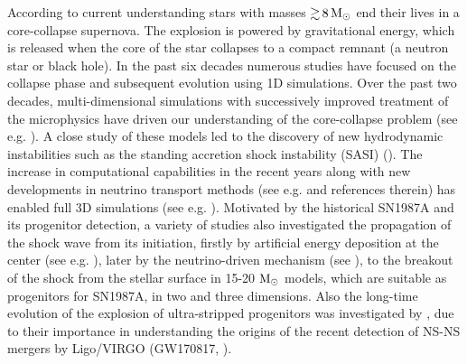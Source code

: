 \documentclass[fleqn,usenatbib]{mnras}
\newcommand{\solm}{\ensuremath{\rm{M_{\odot}}}\xspace}
\begin{document}
According to current understanding stars with masses 
$\mathord{\gtrsim}\,8\, \solm$ end their lives in a core-collapse 
supernova. The explosion is powered by gravitational energy, 
which is released when the core of the star collapses to a compact 
remnant (a neutron star or black hole). In the past six decades 
numerous studies have focused on the collapse phase and subsequent 
evolution using 1D simulations. Over the past two decades, 
multi-dimensional simulations with successively improved treatment 
of the microphysics have driven our understanding of the core-collapse 
problem (see e.g. \citealt{Janka2012,Burrows2013,Janka2016}). 
A close study of these models led to the discovery of new hydrodynamic 
instabilities such as the standing accretion shock instability (SASI) 
(\citealt{Blondin2003,Foglizzo2007}). The increase in computational 
capabilities in the recent years along with new developments in 
neutrino transport methods (see e.g. 
\citealt{Buras2006,OConnor2018,Skinner2019,Glas2019} and references therein)
has enabled full 3D simulations (see e.g. 
\citealt{Melson2015a,Summa2016,Mueller2017,Mueller2018,Vartanyan2018,Melson2019,Vartanyan2019}). 
Motivated by the historical SN1987A and its progenitor detection, a 
variety of studies also investigated the propagation of the shock 
wave from its initiation, firstly by artificial energy deposition 
at the center (see e.g. \citealt{Mueller1991}), later by the 
neutrino-driven mechanism (see \citealt{Kifonidis2003,Hammer2010,Wongwathanarat2015}), 
to the breakout of the shock from the stellar surface in 15-20 $\solm$ models, 
which are suitable as progenitors for SN1987A, in two and three dimensions. 
Also the long-time evolution of the explosion of ultra-stripped 
progenitors was investigated by \cite{Mueller2018}, due to their 
importance in understanding the origins of the recent detection of 
NS-NS mergers by Ligo/VIRGO (GW170817, \citealt{Abbott2017}).
\end{document}
